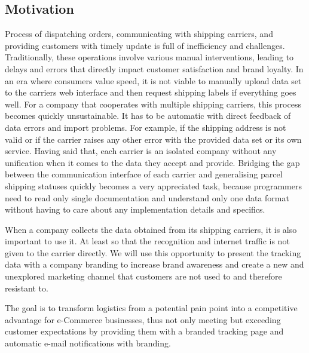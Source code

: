 \subsection*{Motivation}
\label{subsec:motivation}
Process of dispatching orders, communicating with shipping carriers, and providing customers with timely update is full of inefficiency and challenges.
Traditionally, these operations involve various manual interventions, leading to delays and errors that directly impact customer satisfaction and brand loyalty.
In an era where consumers value speed, it is not viable to manually upload data set to the carriers web interface and then request shipping labels if everything goes well. 
For a company that cooperates with multiple shipping carriers, this process becomes quickly unsustainable.
It has to be automatic with direct feedback of data errors and import problems. For example, if the shipping address is not valid or if the carrier raises any other error with the provided data set or its own service.
Having said that, each carrier is an isolated company without any unification when it comes to the data they accept and provide.
Bridging the gap between the communication interface of each carrier and generalising parcel shipping statuses quickly becomes a very appreciated task, because programmers need to read only single documentation and understand only one data format without having to care about any implementation details and specifics.

When a company collects the data obtained from its shipping carriers, it is also important to use it.
At least so that the recognition and internet traffic is not given to the carrier directly.
We will use this opportunity to present the tracking data with a company branding to increase brand awareness and create a new and unexplored marketing channel that customers are not used to and therefore resistant to.

The goal is to transform logistics from a potential pain point into a competitive advantage for e-Commerce businesses, thus not only meeting but exceeding customer expectations by providing them with a branded tracking page and automatic e-mail notifications with branding.

